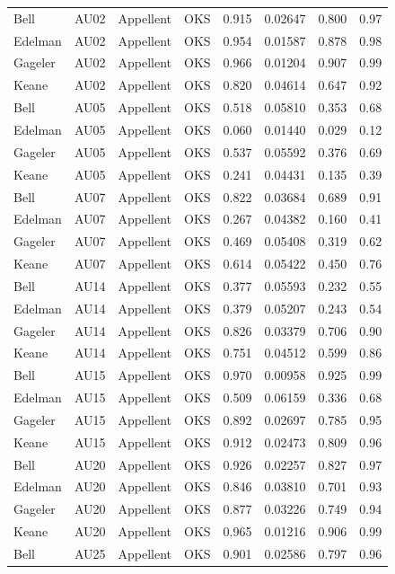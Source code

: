 \documentclass{monashthesis}
\begin{document}
\begin{center}
\begin{longtable}{llllllll}
Bell & AU02 & Appellent & OKS & 0.915 & 0.02647 & 0.800 & 0.97 \\
Edelman & AU02 & Appellent & OKS & 0.954 & 0.01587 & 0.878 & 0.98 \\
Gageler & AU02 & Appellent & OKS & 0.966 & 0.01204 & 0.907 & 0.99 \\
Keane & AU02 & Appellent & OKS & 0.820 & 0.04614 & 0.647 & 0.92 \\
Bell & AU05 & Appellent & OKS & 0.518 & 0.05810 & 0.353 & 0.68 \\
Edelman & AU05 & Appellent & OKS & 0.060 & 0.01440 & 0.029 & 0.12 \\
Gageler & AU05 & Appellent & OKS & 0.537 & 0.05592 & 0.376 & 0.69 \\
Keane & AU05 & Appellent & OKS & 0.241 & 0.04431 & 0.135 & 0.39 \\
Bell & AU07 & Appellent & OKS & 0.822 & 0.03684 & 0.689 & 0.91 \\
Edelman & AU07 & Appellent & OKS & 0.267 & 0.04382 & 0.160 & 0.41 \\
Gageler & AU07 & Appellent & OKS & 0.469 & 0.05408 & 0.319 & 0.62 \\
Keane & AU07 & Appellent & OKS & 0.614 & 0.05422 & 0.450 & 0.76 \\
Bell & AU14 & Appellent & OKS & 0.377 & 0.05593 & 0.232 & 0.55 \\
Edelman & AU14 & Appellent & OKS & 0.379 & 0.05207 & 0.243 & 0.54 \\
Gageler & AU14 & Appellent & OKS & 0.826 & 0.03379 & 0.706 & 0.90 \\
Keane & AU14 & Appellent & OKS & 0.751 & 0.04512 & 0.599 & 0.86 \\
Bell & AU15 & Appellent & OKS & 0.970 & 0.00958 & 0.925 & 0.99 \\
Edelman & AU15 & Appellent & OKS & 0.509 & 0.06159 & 0.336 & 0.68 \\
Gageler & AU15 & Appellent & OKS & 0.892 & 0.02697 & 0.785 & 0.95 \\
Keane & AU15 & Appellent & OKS & 0.912 & 0.02473 & 0.809 & 0.96 \\
Bell & AU20 & Appellent & OKS & 0.926 & 0.02257 & 0.827 & 0.97 \\
Edelman & AU20 & Appellent & OKS & 0.846 & 0.03810 & 0.701 & 0.93 \\
Gageler & AU20 & Appellent & OKS & 0.877 & 0.03226 & 0.749 & 0.94 \\
Keane & AU20 & Appellent & OKS & 0.965 & 0.01216 & 0.906 & 0.99 \\
Bell & AU25 & Appellent & OKS & 0.901 & 0.02586 & 0.797 & 0.96 \\

\end{longtable}
\end{center}
\end{document}
